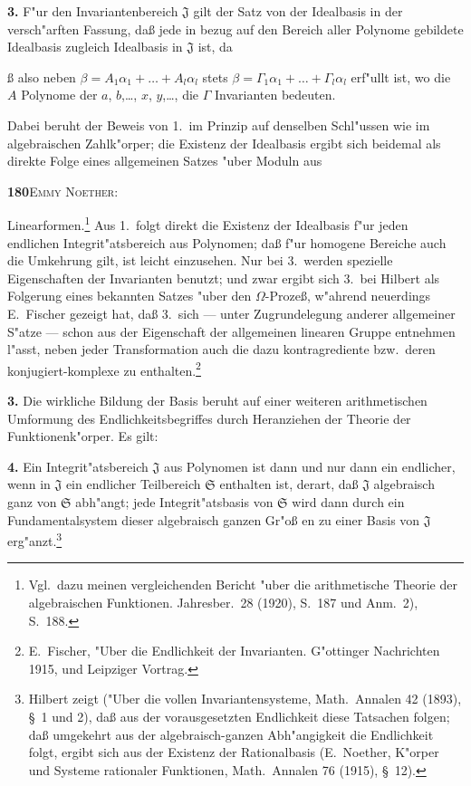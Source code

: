 \documentclass[12pt,a4paper]{article}
\begin{document}
\textbf{3.} F"{u}r den Invariantenbereich $\mathfrak{J}$ gilt der Satz von der Idealbasis in
der versch"{a}rften Fassung, da{\ss} jede in bezug auf den Bereich aller
Polynome gebildete Idealbasis zugleich Idealbasis in $\mathfrak{J}$ ist, da{\ss{}
also neben $\beta=A_{1}\alpha_{1}+\dots+A_{l}\alpha_{l}$ stets
$\beta=\Gamma_{1}\alpha_{1}+\dots+\Gamma_{l}\alpha_{l}$ erf"{u}llt ist,
wo die $A$ Polynome der $a$, $b$,\dots, $x$, $y$,\dots, die $\Gamma$ Invarianten
bedeuten.

Dabei beruht der Beweis von 1.\ im Prinzip auf denselben Schl"{u}ssen
wie im algebraischen Zahlk"{o}rper; die Existenz der Idealbasis ergibt sich
beidemal als direkte Folge eines allgemeinen Satzes "{u}ber Moduln aus

\newpage
\begin{center}
\textbf{180}\quad\textsc{Emmy Noether:}
\end{center}

Linearformen.\footnote{Vgl.\ dazu meinen vergleichenden Bericht "{u}ber die arithmetische Theorie
der algebraischen Funktionen. Jahresber.\ 28 (1920), S.~187 und Anm.~2), S.~188.} Aus 1.\ folgt direkt die Existenz der Idealbasis f"{u}r jeden
endlichen Integrit"{a}tsbereich aus Polynomen; da{\ss} f"{u}r homogene Bereiche
auch die Umkehrung gilt, ist leicht einzusehen. Nur bei 3.\ werden
spezielle Eigenschaften der Invarianten benutzt; und zwar ergibt sich 3.\ bei Hilbert als Folgerung eines bekannten Satzes "{u}ber den $\Omega$-Proze{\ss},
w"{a}hrend neuerdings E.~Fischer gezeigt hat, da{\ss} 3.\ sich --- unter Zugrundelegung
anderer allgemeiner S"{a}tze --- schon aus der Eigenschaft der
allgemeinen linearen Gruppe entnehmen l"{a}sst, neben jeder Transformation
auch die dazu kontragrediente bzw.\ deren konjugiert-komplexe zu enthalten.\footnote{E.~Fischer, "{U}ber die Endlichkeit der Invarianten. G"{o}ttinger Nachrichten
1915, und Leipziger Vortrag.}

\textbf{3.} Die wirkliche Bildung der Basis beruht auf einer weiteren arithmetischen
Umformung des Endlichkeitsbegriffes durch Heranziehen der
Theorie der Funktionenk"{o}rper. Es gilt:

\textbf{4.} Ein Integrit"{a}tsbereich $\mathfrak{J}$ aus Polynomen ist dann und nur dann
ein endlicher, wenn in $\mathfrak{J}$ ein endlicher Teilbereich $\mathfrak{S}$ enthalten ist,
derart, da{\ss} $\mathfrak{J}$ algebraisch ganz von $\mathfrak{S}$ abh"{a}ngt; jede Integrit"{a}tsbasis
von $\mathfrak{S}$ wird dann durch ein Fundamentalsystem dieser algebraisch
ganzen Gr"{o}{\ss} en zu einer Basis von $\mathfrak{J}$ erg"{a}nzt.\footnote{Hilbert zeigt ("{U}ber die vollen Invariantensysteme, Math.\ Annalen 42 (1893),
\S~1 und 2), da{\ss} aus der vorausgesetzten Endlichkeit diese Tatsachen folgen; da{\ss{}}
umgekehrt aus der algebraisch-ganzen Abh"{a}ngigkeit die Endlichkeit folgt, ergibt
sich aus der Existenz der Rationalbasis (E.~Noether, K"{o}rper und Systeme rationaler
Funktionen, Math.\ Annalen 76 (1915), \S~12).}

}
\end{document}
